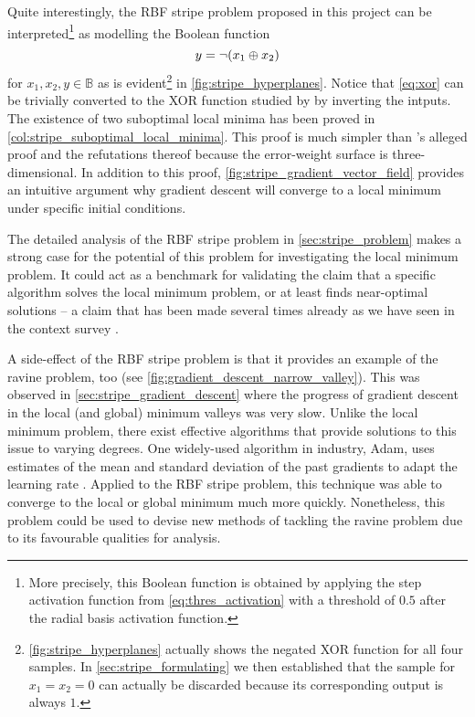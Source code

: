 Quite interestingly, the RBF stripe problem proposed in this project can be interpreted\footnote{More precisely, this Boolean function is obtained by applying the step activation function from \ref{eq:thres_activation} with a threshold of $0.5$ after the radial basis activation function.} as modelling the Boolean function
\begin{equation}
    \label{eq:xor}
    y=\neg (x_1 \oplus x_2)
\end{equation}
for $x_1,x_2,y\in \mathbb{B}$ as is evident\footnote{\ref{fig:stripe_hyperplanes} actually shows the negated XOR function for all four samples. In \ref{sec:stripe_formulating} we then established that the sample for $x_1=x_2=0$ can actually be discarded because its corresponding output is always $1$.} in \ref{fig:stripe_hyperplanes}.
Notice that \ref{eq:xor} can be trivially converted to the XOR function studied by \citeauthor{blum1989} by inverting the intputs.
The existence of two suboptimal local minima has been proved in \ref{col:stripe_suboptimal_local_minima}.
This proof is much simpler than \citeauthor{blum1989}'s alleged proof and the refutations thereof because the error-weight surface is three-dimensional.
In addition to this proof, \ref{fig:stripe_gradient_vector_field} provides an intuitive argument why gradient descent will converge to a local minimum under specific initial conditions.

The detailed analysis of the RBF stripe problem in \ref{sec:stripe_problem} makes a strong case for the potential of this problem for investigating the local minimum problem.
It could act as a benchmark for validating the claim that a specific algorithm solves the local minimum problem, or at least finds near-optimal solutions -- a claim that has been made several times already as we have seen in the context survey \cite{kawaguchi2016,choi2008,hirasawa1998,lo2012,lo2017}.

A side-effect of the RBF stripe problem is that it provides an example of the ravine problem, too (see \ref{fig:gradient_descent_narrow_valley}).
This was observed in \ref{sec:stripe_gradient_descent} where the progress of gradient descent in the local (and global) minimum valleys was very slow.
Unlike the local minimum problem, there exist effective algorithms that provide solutions to this issue to varying degrees.
One widely-used algorithm in industry, Adam, uses estimates of the mean and standard deviation of the past gradients to adapt the learning rate \cite{kingma2014}.
Applied to the RBF stripe problem, this technique was able to converge to the local or global minimum much more quickly.
Nonetheless, this problem could be used to devise new methods of tackling the ravine problem due to its favourable qualities for analysis.

